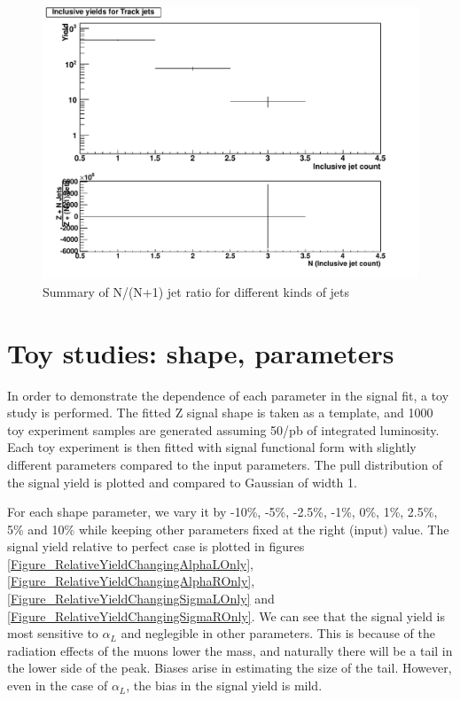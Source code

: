 \documentclass{cmspaper2}
\begin{document}
\begin{figure}[hbtp]
   \begin{center}
   \includegraphics[width=150mm]{FinalPlot_FloatAll_Track}
   \caption{Summary of N/(N+1) jet ratio for different kinds of jets}
   \label{Figure_RatioFromDataTrackJet}
   \end{center}
\end{figure}


\section{Toy studies: shape, parameters}

In order to demonstrate the dependence of each parameter in the signal fit, a toy study is performed.
The fitted Z signal shape is taken as a template, and 1000 toy experiment samples are generated assuming 50/pb of integrated luminosity.
Each toy experiment is then fitted with signal functional form with slightly different parameters compared to the input parameters.
The pull distribution of the signal yield is plotted and compared to Gaussian of width 1.

For each shape parameter, we vary it by -10\%, -5\%, -2.5\%, -1\%, 0\%, 1\%, 2.5\%, 5\% and 10\% while keeping other parameters fixed at the right (input) value.
The signal yield relative to perfect case is plotted in figures \ref{Figure_RelativeYieldChangingAlphaLOnly}, \ref{Figure_RelativeYieldChangingAlphaROnly},
\ref{Figure_RelativeYieldChangingSigmaLOnly} and \ref{Figure_RelativeYieldChangingSigmaROnly}.
We can see that the signal yield is most sensitive to $\alpha_L$ and neglegible in other parameters.
This is because of the radiation effects of the muons lower the mass, and naturally there will be a tail in the lower side of the peak.
Biases arise in estimating the size of the tail.
However, even in the case of $\alpha_L$, the bias in the signal yield is mild.
\end{document}

